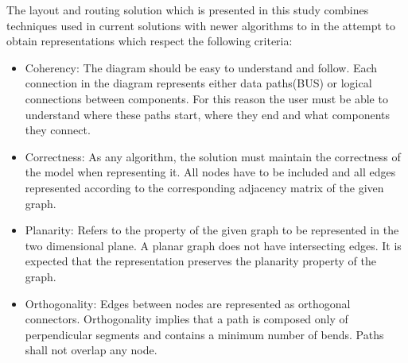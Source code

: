 The layout and routing solution which is presented in this study combines techniques used in current solutions with newer algorithms 
to in the attempt to obtain representations which respect the following criteria:

\begin{itemize}

\item Coherency: The diagram should be easy to understand and follow. Each connection in the diagram represents either 
data paths(BUS) or logical connections between components. For this reason the user must be able to understand where these paths start, 
where they end and what components they connect.

\item Correctness: As any algorithm, the solution must maintain the correctness of the model when representing it. All nodes have to be
included and all edges represented according to the corresponding adjacency matrix of the given graph.

\item Planarity: Refers to the property of the given graph to be represented in the two dimensional plane. A planar graph does not have 
intersecting edges. It is expected that the representation preserves the planarity property of the graph.

\item Orthogonality: Edges between nodes are represented as orthogonal connectors. Orthogonality implies that a path is composed only
of perpendicular segments and contains a minimum number of bends. Paths shall not overlap any node.

\end{itemize}
